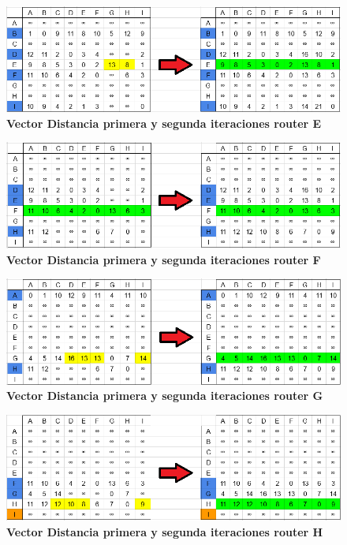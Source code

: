 \documentclass[12pt]{article}
\begin{document}
\begin{figure}[H] 
\centering 
\includegraphics[width=1\textwidth]{imagenes/3E1-2.png} \caption{\small \textbf{Vector Distancia primera y segunda iteraciones router E}}
\label{fig:diagrama_68} 
\end{figure}
\begin{figure}[H] 
\centering 
\includegraphics[width=1\textwidth]{imagenes/3F1-2.png} \caption{\small \textbf{Vector Distancia primera y segunda iteraciones router F}}
\label{fig:diagrama_69} 
\end{figure}
\begin{figure}[H] 
\centering 
\includegraphics[width=1\textwidth]{imagenes/3G1-2.png} \caption{\small \textbf{Vector Distancia primera y segunda iteraciones router G}}
\label{fig:diagrama_70} 
\end{figure}
\begin{figure}[H] 
\centering 
\includegraphics[width=1\textwidth]{imagenes/3H1-2.png} \caption{\small \textbf{Vector Distancia primera y segunda iteraciones router H}}
\label{fig:diagrama_71} 
\end{figure}
\end{document}
